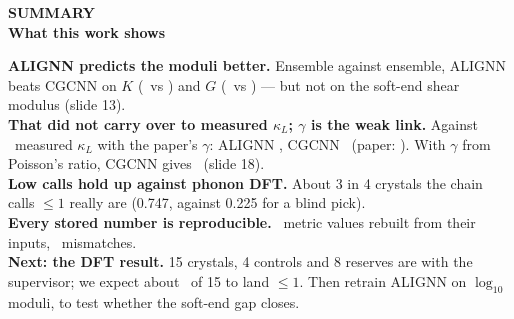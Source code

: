\documentclass[aspectratio=169]{beamer}
\begin{document}
\begingroup
{}
\begin{frame}[plain]
\vspace{0.3cm}
\begin{center}
{\color{LightBlue}\bfseries\sffamily\large SUMMARY}\\[6pt]
{\color{white}\bfseries\headingfont\fontsize{24}{30}\selectfont
  What this work shows}\\[10pt]
\begin{minipage}{0.84\linewidth}
{\color{Subtle}\sffamily\footnotesize
\textbf{\color{white}ALIGNN predicts the moduli better.} Ensemble against
ensemble, ALIGNN beats CGCNN on $K$ (\DEnsMaeAlK\ vs \DEnsMaeCgK) and $G$
(\DEnsMaeAlG\ vs \DEnsMaeCgG) --- but not on the soft-end shear modulus
(slide 13).\\[6pt]
\textbf{\color{white}That did not carry over to measured $\kappa_L$; $\gamma$ is the
weak link.} Against \DMeasN\ measured $\kappa_L$ with the paper's $\gamma$:
ALIGNN \DMeasAlPaper, CGCNN \DMeasCgPaper\ (paper: \DMeasPink). With $\gamma$ from
Poisson's ratio, CGCNN gives \DMeasCgDerived\ (slide 18).\\[6pt]
\textbf{\color{white}Low calls hold up against phonon DFT.} About 3 in 4
crystals the chain calls $\leq 1$ really are (0.747, against 0.225 for a blind
pick).\\[6pt]
\textbf{\color{white}Every stored number is reproducible.} \AudMetricRows\
metric values rebuilt from their inputs, \AudMismatch\ mismatches.\\[6pt]
\textbf{\color{white}Next: the DFT result.} 15 crystals, 4 controls and 8
reserves are with the supervisor; we expect about \AudExpect\ of 15 to land
$\leq 1$. Then retrain ALIGNN on $\log_{10}$ moduli, to test whether the soft-end gap closes.\par}
\end{minipage}
\end{center}
\end{frame}
\endgroup
\end{document}
